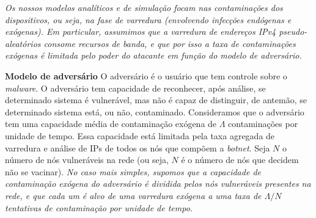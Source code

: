  
\emph{Os nossos modelos  analíticos e de  simulação focam nas contaminações dos dispositivos, ou seja, na fase de varredura (envolvendo infecções  endógenas e exógenas). Em particular, assumimos que a varredura de endereços  IPv4 pseudo-aleatórios consome recursos de banda, e que por isso a taxa de contaminações exógenas é limitada pelo \emph{poder do atacante} em função do modelo de adversário. }
    
    \textbf{Modelo de adversário}
     O  adversário é o usuário que tem controle sobre o \textit{malware}. O adversário tem capacidade de reconhecer, após análise, se determinado sistema é  vulnerável, mas não é capaz de distinguir, de antemão, se determinado sistema  está, ou não, contaminado.
    Consideramos que o adversário tem uma capacidade média de contaminação exógena  de  $\Lambda$ contaminações por unidade de tempo. Essa capacidade está limitada pela taxa agregada de varredura e análise de IPs de todos os  nós que compõem a \emph{botnet}. Seja $N$ o número de nós vulneráveis na rede (ou seja, $N$ é  o número de nós que decidem não se vacinar). \emph{ No caso mais simples, supomos que a capacidade de contaminação exógena do adversário é dividida pelos nós vulneráveis presentes na rede, e que cada um é alvo de uma varredura exógena a uma taxa de  $\Lambda/N$ tentativas de contaminação por unidade de tempo.}
	
        
 